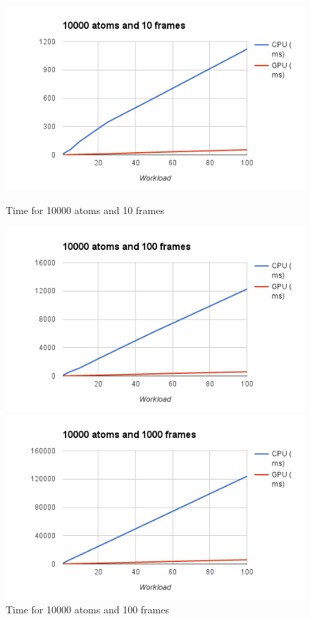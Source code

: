 \documentclass[11pt,a4paper]{report}
\begin{document}
\begin{figure}[!tbp]
  \centering
  \begin{minipage}[b]{0.4\textwidth}
    \includegraphics[width=\textwidth]{images/exp_10000_10}
    \caption{Time for 10000 atoms and 10 frames}
    \label{fg:exp_10000_10}
  \end{minipage}
  \hfill
  \begin{minipage}[b]{0.4\textwidth}
    \includegraphics[width=\textwidth]{images/exp_10000_100}
    \caption{Time for 10000 atoms and 100 frames}
     \label{fg:exp_10000_100}
  \end{minipage}
\hfill
  \begin{minipage}[b]{0.4\textwidth}
    \includegraphics[width=\textwidth]{images/exp_10000_1000}

\end{minipage}
\end{figure}
\end{document}
